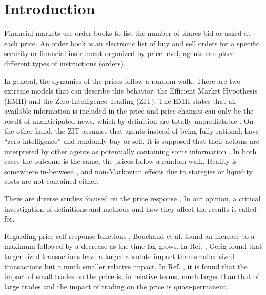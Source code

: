 \section{Introduction}\label{sec:introduction}

Financial markets use order books to list the number of shares bid or asked at
each price. An order book is an electronic list of buy and sell orders for a
specific security or financial instrument organized by price level, agents can
place different types of instructions (orders).

In general, the dynamics of the prices follow a random walk. There are two
extreme models that can describe this behavior: the Efficient Market Hypothesis
(EMH) and the Zero Intelligence Trading (ZIT). The EMH states that all
available information is included in the price and price changes can only be
the result of unanticipated news, which by definition are totally unpredictable
\cite{subtle_nature,Bouchaud_2004,EMH_lillo,stat_theory}. On the other hand,
the ZIT assumes that agents instead of being fully rational, have ``zero
intelligence” and randomly buy or sell. It is supposed that their actions are
interpreted by other agents as potentially containing some information
\cite{subtle_nature,Bouchaud_2004,stat_theory,Wang_2016_cross}.
In both cases the outcome is the same, the prices follow a random walk. Reality
is somewhere in-between \cite{Bouchaud_2004,stat_theory}, and non-Markovian
effects due to stategies or liquidity costs are not contained either.

There are diverse studies focused on the price response
\cite{dissecting_cross,r_walks_liquidity,subtle_nature,Bouchaud_2004,large_prices_changes,pow_law_dist,theory_market_impact,spread_changes_affect,master_curve,EMH_lillo,quant_stock_price_response,ori_pow_law,prop_order_book,Wang_2018_b,Wang_2018_a,Wang_2016_avg,Wang_2016_cross},
In our opinion, a critical investigation of definitions and methods and how
they affect the results is called for.

Regarding price self-response functions
\cite{r_walks_liquidity,subtle_nature,Bouchaud_2004}, Bouchaud et al. found an
increase to a maximum followed by a decrease as the time lag grows.
In Ref. \cite{theory_market_impact}, Gerig found that larger sized transactions
have a larger absolute impact than smaller sized transactions but a much
smaller relative impact. In Ref. \cite{prop_order_book}, it is found that the
impact of small trades on the price is, in relative terms, much larger than
that of large trades and the impact of trading on the price is quasi-permanent.

